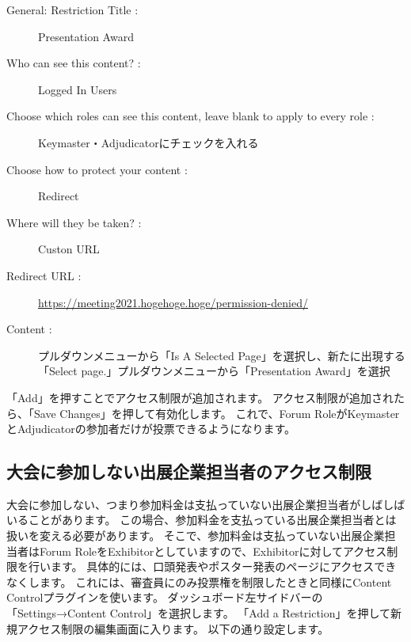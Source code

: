 \documentclass[titlepage,10pt,a4paper,uplatex]{jsbook}
\begin{document}
\begin{description}
\item[General: Restriction Title : ] Presentation Award
\item[Who can see this content? : ] Logged In Users
\item[Choose which roles can see this content, leave blank to apply to every role : ] Keymaster・Adjudicatorにチェックを入れる
\item[Choose how to protect your content : ] Redirect
\item[Where will they be taken? : ] Custon URL
\item[Redirect URL : ] \url{https://meeting2021.hogehoge.hoge/permission-denied/}
\item[Content : ] プルダウンメニューから「Is A Selected Page」を選択し、新たに出現する「Select page.」プルダウンメニューから「Presentation Award」を選択
\end{description}

「Add」を押すことでアクセス制限が追加されます。
アクセス制限が追加されたら、「Save Changes」を押して有効化します。
これで、Forum RoleがKeymasterとAdjudicatorの参加者だけが投票できるようになります。

\subsection{大会に参加しない出展企業担当者のアクセス制限}

大会に参加しない、つまり参加料金は支払っていない出展企業担当者がしばしばいることがあります。
この場合、参加料金を支払っている出展企業担当者とは扱いを変える必要があります。
そこで、参加料金は支払っていない出展企業担当者はForum RoleをExhibitorとしていますので、Exhibitorに対してアクセス制限を行います。
具体的には、口頭発表やポスター発表のページにアクセスできなくします。
これには、審査員にのみ投票権を制限したときと同様にContent Controlプラグインを使います。
ダッシュボード左サイドバーの「Settings→Content Control」を選択します。
「Add a Restriction」を押して新規アクセス制限の編集画面に入ります。
以下の通り設定します。
\end{document}
